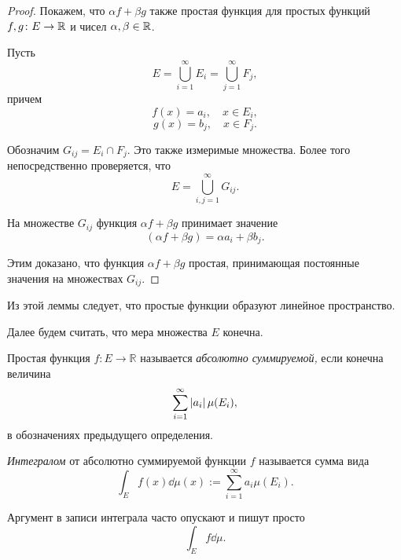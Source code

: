 \begin{proof}
    Покажем, что $\alpha f + \beta g$ также простая функция для простых функций
    $f, g \colon E \to \mathbb{R}$ и чисел $\alpha, \beta \in \mathbb{R}$.

    Пусть
    \[ E = \bigcup_{i=1}^\infty E_i = \bigcup_{j=1}^\infty F_j, \]
    причем 
    \[ f(x) = a_i, \quad x \in E_i, \]
    \[ g(x) = b_j, \quad x \in F_j. \]

    Обозначим $G_{ij} = E_i \cap F_j$. Это также измеримые множества. Более того
    непосредственно проверяется, что
    \[ E = \bigcup_{i, j = 1}^\infty G_{ij}. \]

    На множестве $G_{ij}$ функция $\alpha f + \beta g$ принимает значение
    \[ (\alpha f + \beta g) = \alpha a_i + \beta b_j. \]

    Этим доказано, что функция $\alpha f + \beta g$ простая, принимающая
    постоянные значения на множествах $G_{ij}$.
\end{proof}

Из этой леммы следует, что простые функции образуют линейное пространство.

Далее будем считать, что мера множества $E$ конечна.

\begin{definition}
    Простая функция $f \colon E \to \mathbb R$ называется \emph{абсолютно
    суммируемой,}
    если конечна величина 
    \[ \sum_{i=1}^\infty \left|a_i\right| \mu(E_i), \]
    в обозначениях предыдущего определения.
\end{definition}

\begin{definition}
    \emph{Интегралом} от абсолютно суммируемой функции $f$ называется сумма вида
    \[ \int_E f(x) \dd \mu(x) := \sum_{i=1}^\infty a_i \mu(E_i). \]
\end{definition}

Аргумент в записи интеграла часто опускают и пишут просто
\[ \int_E f \dd \mu. \]

